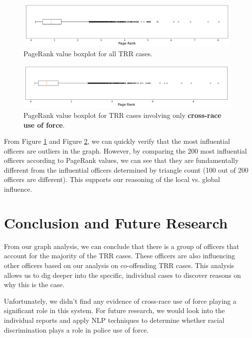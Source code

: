 \documentclass[10pt]{article}
\begin{document}
\begin{figure}[H]
\centering
\includegraphics[width=\textwidth]{pr}
\caption{PageRank value boxplot for all TRR cases.}
\label{pr}
\end{figure}

\begin{figure}[H]
\centering
\includegraphics[width=\textwidth]{pr_cross_race}
\caption{PageRank value boxplot for TRR cases involving only \textbf{cross-race use of force}.}
\label{pr_cross_race}
\end{figure}

From Figure \ref{pr} and Figure \ref{pr_cross_race}, we can quickly verify that the most influential officers are outliers in the graph. However, by comparing the 200 most influential officers according to PageRank values, we can see that they are fundamentally different from the influential officers determined by triangle count (100 out of 200 officers are different). This supports our reasoning of the local vs. global influence.


\section{Conclusion and Future Research}

From our graph analysis, we can conclude that there is a group of officers that account for the majority of the TRR cases. These officers are also influencing other officers based on our analysis on co-offending TRR cases. This analysis allows us to dig deeper into the specific, individual cases to discover reasons on why this is the case.

Unfortunately, we didn’t find any evidence of cross-race use of force playing a significant role in this system. For future research, we would look into the individual reports and apply NLP techniques to determine whether racial discrimination plays a role in police use of force.
\end{document}
